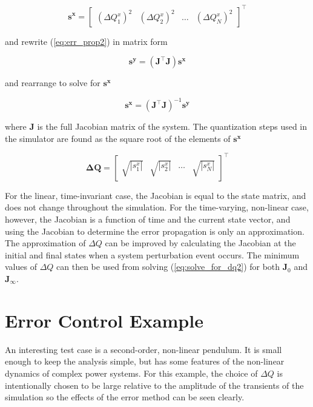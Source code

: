 \begin{equation} \label{eq:covar_sx}
\mathbf{s^x} = 
\begin{bmatrix}
\left( \Delta Q_1^x \right)^2 &
\left( \Delta Q_2^x \right)^2 & \dots &
\left( \Delta Q_N^x \right)^2
\end{bmatrix}^\top
\end{equation}

and rewrite (\ref{eq:err_prop2}) in matrix form

\begin{equation} \label{eq:solve_for_dq1}
\mathbf{s^y} = \mathbf{ \left( J^\top J \right) s^x }
\end{equation}

and rearrange to solve for $\mathbf{s^x}$ 

\begin{equation} \label{eq:solve_for_dq2}
\mathbf{s^x} = \mathbf{ \left( J^\top J \right)}^{-1} \mathbf{s^y}
\end{equation}

where $\mathbf{J}$ is the full Jacobian matrix of the system. The quantization steps used in the simulator are found as the square root of the elements of $\mathbf{s^x}$

\begin{equation} \label{eq:dq_final}
\mathbf{\Delta Q} = 
\begin{bmatrix}
\sqrt{|s_1^x|} &
\sqrt{|s_2^x|} & \dots &
\sqrt{|s_N^x|}
\end{bmatrix}^\top
\end{equation}

For the linear, time-invariant case, the Jacobian is equal to the state matrix, and does not change throughout the simulation. For the time-varying, non-linear case, however, the Jacobian is a function of time and the current state vector, and using the Jacobian to determine the error propagation is only an approximation. The approximation of $\Delta Q$ can be improved by calculating the Jacobian at the initial and final states when a system perturbation event occurs. The minimum values of $\Delta Q$ can then be used from solving (\ref{eq:solve_for_dq2}) for both $\mathbf{J}_0$ and $\mathbf{J}_\infty$. 

\section{Error Control Example}

An interesting test case is a second-order, non-linear pendulum. It is small enough to keep the analysis simple, but has some features of the non-linear dynamics of complex power systems. For this example, the choice of $\Delta Q$ is intentionally chosen to be large relative to the amplitude of the transients of the simulation so the effects of the error method can be seen clearly.  

